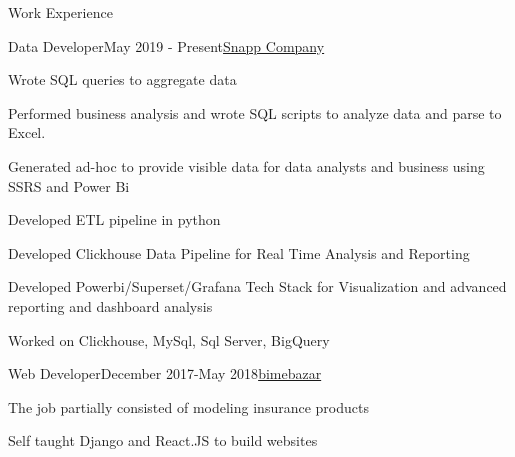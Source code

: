 \documentclass{resume} %
\begin{document}
	\begin{rSection}{Work  Experience}
		\begin{rSubsection}{Data Developer}{May 2019 - Present}{\href{https://en.wikipedia.org/wiki/Snapp!}{\textcolor{coolblack}{Snapp Company}}}{ }
		\item Wrote SQL queries to aggregate data
		\item Performed business analysis and wrote SQL scripts to analyze data and parse to Excel.
		\item Generated ad-hoc to provide visible data for data analysts and business using SSRS and Power Bi
		\item Developed ETL pipeline in python
		\item Developed Clickhouse Data Pipeline for Real Time Analysis and Reporting
		\item Developed Powerbi/Superset/Grafana Tech Stack for Visualization and  advanced reporting and dashboard analysis
		\item Worked on Clickhouse, MySql, Sql Server, BigQuery
		\end{rSubsection}				
	\begin{rSubsection}{Web Developer}{December 2017-May 2018}{\href{https://bimebazar.com/}{\textcolor{coolblack}{bimebazar}}}{ }
		\item The job partially consisted of modeling insurance products
		\item Self taught Django and React.JS to build websites
		
		\end{rSubsection}					%
	
		
		
	\end{rSection}
	
\end{document}
